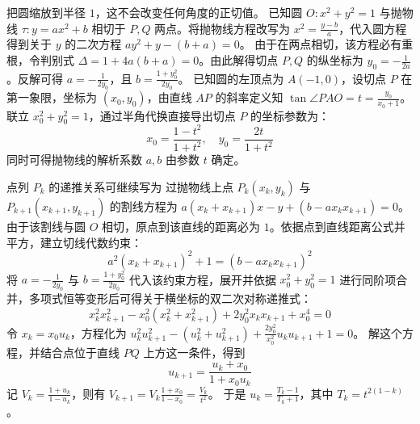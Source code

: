 \begin{solution}
把圆缩放到半径 $1$，这不会改变任何角度的正切值。
已知圆 $O: x^2 + y^2 = 1$ 与抛物线 $\tau: y = ax^2 + b$ 相切于 $P,Q$ 两点。将抛物线方程改写为 $x^2 = \frac{y-b}{a}$，代入圆方程得到关于 $y$ 的二次方程 $ay^2 + y - (b+a) = 0$。
由于在两点相切，该方程必有重根，令判别式 $\Delta = 1 + 4a(b+a) = 0$。由此解得切点 $P,Q$ 的纵坐标为 $y_0 = -\frac{1}{2a}$。反解可得 $a = -\frac{1}{2y_0}$，且 $b = \frac{1+y_0^2}{2y_0}$。
已知圆的左顶点为 $A(-1, 0)$，设切点 $P$ 在第一象限，坐标为 $(x_0, y_0)$，由直线 $AP$ 的斜率定义知 $\tan\angle PAO = t = \frac{y_0}{x_0+1}$。
联立 $x_0^2 + y_0^2 = 1$，通过半角代换直接导出切点 $P$ 的坐标参数为：
\[ x_0 = \frac{1-t^2}{1+t^2}, \quad y_0 = \frac{2t}{1+t^2} \]
同时可得抛物线的解析系数 $a,b$ 由参数 $t$ 确定。

点列 $P_k$ 的递推关系可继续写为
过抛物线上点 $P_k(x_k, y_k)$ 与 $P_{k+1}(x_{k+1}, y_{k+1})$ 的割线方程为 $a(x_k+x_{k+1})x - y + (b - a x_k x_{k+1}) = 0$。
由于该割线与圆 $O$ 相切，原点到该直线的距离必为 $1$。依据点到直线距离公式并平方，建立切线代数约束：
\[ a^2(x_k+x_{k+1})^2 + 1 = (b - a x_k x_{k+1})^2 \]
将 $a = -\frac{1}{2y_0}$ 与 $b = \frac{1+y_0^2}{2y_0}$ 代入该约束方程，展开并依据 $x_0^2 + y_0^2 = 1$ 进行同阶项合并，多项式恒等变形后可得关于横坐标的双二次对称递推式：
\[ x_k^2 x_{k+1}^2 - x_0^2(x_k^2 + x_{k+1}^2) + 2y_0^2 x_k x_{k+1} + x_0^4 = 0 \]
令 $x_k = x_0 u_k$，方程化为 $u_k^2 u_{k+1}^2 - (u_k^2 + u_{k+1}^2) + \frac{2y_0^2}{x_0^2} u_k u_{k+1} + 1 = 0$。
解这个方程，并结合点位于直线 $PQ$ 上方这一条件，得到
\[ u_{k+1} = \frac{u_k + x_0}{1 + x_0 u_k} \]
记 $V_k = \frac{1+u_k}{1-u_k}$，则有 $V_{k+1} = V_k \frac{1+x_0}{1-x_0} = \frac{V_k}{t^2}$。
于是 $u_k = \frac{T_k - 1}{T_k + 1}$，其中 $T_k = t^{2(1-k)}$。


\end{solution}
